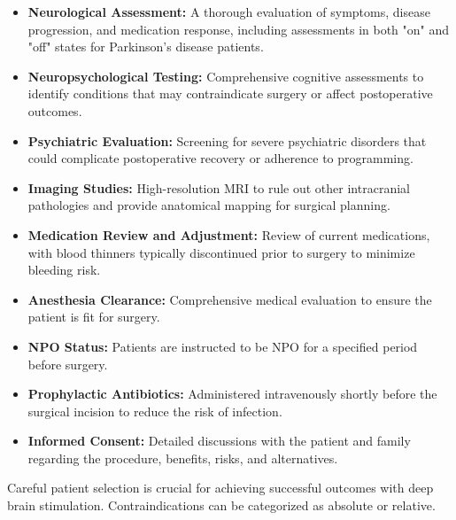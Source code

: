 \begin{itemize}
  \item \textbf{Neurological Assessment:} A thorough evaluation of symptoms, disease progression, and medication response, including assessments in both "on" and "off" states for Parkinson's disease patients.
  \item \textbf{Neuropsychological Testing:} Comprehensive cognitive assessments to identify conditions that may contraindicate surgery or affect postoperative outcomes.
  \item \textbf{Psychiatric Evaluation:} Screening for severe psychiatric disorders that could complicate postoperative recovery or adherence to programming.
  \item \textbf{Imaging Studies:} High-resolution MRI to rule out other intracranial pathologies and provide anatomical mapping for surgical planning.
  \item \textbf{Medication Review and Adjustment:} Review of current medications, with blood thinners typically discontinued prior to surgery to minimize bleeding risk.
  \item \textbf{Anesthesia Clearance:} Comprehensive medical evaluation to ensure the patient is fit for surgery.
  \item \textbf{NPO Status:} Patients are instructed to be NPO for a specified period before surgery.
  \item \textbf{Prophylactic Antibiotics:} Administered intravenously shortly before the surgical incision to reduce the risk of infection.
  \item \textbf{Informed Consent:} Detailed discussions with the patient and family regarding the procedure, benefits, risks, and alternatives.
\end{itemize}

Careful patient selection is crucial for achieving successful outcomes with deep brain stimulation. Contraindications can be categorized as absolute or relative.

